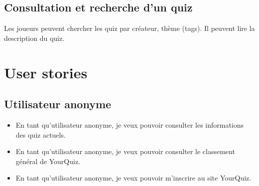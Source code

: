 \documentclass[a4paper, 12pt]{article}
\begin{document}
\subsection{Consultation et recherche d'un quiz}
Les joueurs peuvent chercher les quiz par créateur, thème (tags). Il peuvent lire la description du quiz.

\newpage
\section{User stories}
\subsection{Utilisateur anonyme}
\begin{itemize}
    \item En tant qu’utilisateur anonyme, je veux pouvoir consulter les informations des quiz actuels.
    \item En tant qu’utilisateur anonyme, je veux pouvoir consulter le classement général de YourQuiz.
    \item En tant qu’utilisateur anonyme, je veux pouvoir m’inscrire au site YourQuiz.
\end{itemize}
\end{document}
